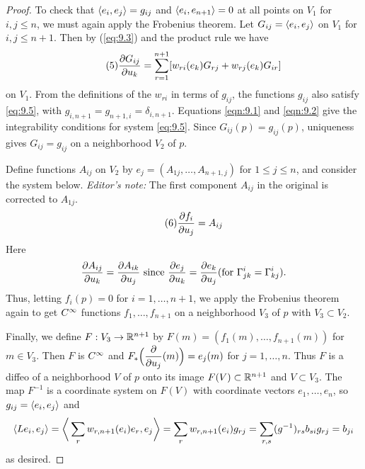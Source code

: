 \documentclass[../main]{subfiles}
\begin{document}
\begin{proof}
To check that $\left\langle e_i,e_j\right\rangle = g_{ij} $ and $\left\langle e_i,e_{n+1}\right\rangle=0$ at all points on $V_{1}$ for $i, j \leq n$, we must again apply the Frobenius theorem. Let $G_{i j}=\left\langle e_i,e_j\right\rangle$ on $V_{1}$ for $i, j \leq n+1$. Then by (\ref{eq:9.3}) and the product rule we have
\[\tag{5}\label{eq:9.5} \dfrac{\partial G_{ij}}{\partial u_k} = \sum_{r=1}^{n+1}[w_{ri}(e_k)G_{rj} + w_{rj}(e_k)G_{ir}]\]
on $V_1$. From the definitions of the $w_{ri}$ in terms of $g_{ij}$, the functions $g_{ij}$ also satisfy \eqref{eq:9.5}, with $g_{i,n+1}=g_{n+1,i}=\delta_{i,n+1}$. Equations \eqref{eqn:9.1} and \eqref{eqn:9.2} give the integrability conditions for system \eqref{eq:9.5}. Since $G_{ij}(p)=g_{ij}(p)$, uniqueness gives $G_{ij}=g_{ij}$ on a neighborhood $V_2$ of $p$.

Define functions $A_{ij}$ on $V_2$ by $e_j=(A_{1j},\ldots,A_{n+1,j})$ for $1\leq j\leq n$, and consider the system below. \emph{Editor's note:} The first component $A_{ij}$ in the original is corrected to $A_{1j}$.
\[\tag{6}\label{eq:9.6} \dfrac{\partial f_i}{\partial u_j} = A_{ij} \]
Here \[\dfrac{\partial A_{ij}}{\partial u_k} = \dfrac{\partial A_{ik}}{\partial u_j}\text{ since } \dfrac{\partial e_j}{\partial u_k}=\dfrac{\partial e_k}{\partial u_j}(\text{for  }\Gamma^i_{jk}=\Gamma^i_{kj}).\] Thus, letting $f_{i}(p)=0$ for $i=1, \ldots, n+1$, we apply the Frobenius theorem again to get $C^\infty$ functions $f_{1}, \ldots, f_{n+1}$ on a neighborhood $V_{3}$ of $p$ with $V_{3} \subset V_{2}$.

Finally, we define $F: V_{3} \to \mathbb{R}^{n+1}$ by $F(m)=(f_{1}(m), \ldots, f_{n+1}(m))$ for $m\in V_{3}$. Then $F$ is $C^\infty$ and $F_\ast\Big(\dfrac{\partial }{\partial u_j}(m)\Big) = e_j(m)$ for $j=1, \ldots, n$. Thus $F$ is a diffeo of a neighborhood $V$ of $p$ onto its image $F(V)\subset \mathbb{R}^{n+1}$ and $V \subset V_{3}$. The map $F^{-1}$ is a coordinate system on $F(V)$ with coordinate vectors $e_{1}, \ldots, e_{n}$, so $g_{i j}=\left\langle e_i,e_j\right\rangle$ and
\[\left\langle Le_i,e_j\right\rangle = \bigg\langle\sum_rw_{r,n+1}(e_i)e_r,e_j\bigg\rangle = \sum_r w_{r,n+1}(e_i)g_{rj} = \sum_{r,s} (g^{-1})_{rs}b_{si}g_{rj} = b_{ji}\]
as desired.

\end{proof}
\end{document}
